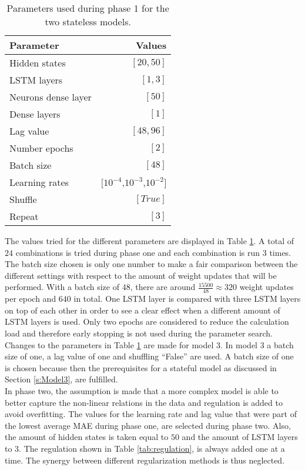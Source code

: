 \begin{table}[ht]
	\centering
	\begin{tabular}{@{}l|r@{}} \toprule
		\textbf{Parameter}	& \textbf{Values}\\\midrule
		Hidden states &  $ [20,50] $\\
		LSTM layers & $ [1,3] $\\
		Neurons dense layer & $ [50] $\\
		Dense layers & $ [1] $\\
		Lag value & $ [48,96] $\\
		Number epochs & $ [2] $\\
		Batch size & $ [48] $\\
		Learning rates & $[ 10^{-4} $,$ 10^{-3} $,$ 10^{-2} ]$\\
		Shuffle & $ [True] $\\
		Repeat & $ [3] $\\\bottomrule
	\end{tabular}
	\caption{Parameters used during phase 1 for the two stateless models.}
	\label{tab:para_phase1}
\end{table}

The values tried for the different parameters are displayed in Table \ref{tab:para_phase1}. A total of $ 24 $ combinations is tried during phase one and each combination is run $ 3 $ times. The batch size chosen is only one number to make a fair comparison between the different settings with respect to the amount of weight updates that will be performed. With a batch size of $ 48 $, there are around $ \frac{15500}{48}\approx 320 $ weight updates per epoch and $ 640 $ in total. One LSTM layer is compared with three LSTM layers on top of each other in order to see a clear effect when a different amount of LSTM layers is used. Only two epochs are considered to reduce the calculation load and therefore early stopping is not used during the parameter search.\\

Changes to the parameters in Table \ref{tab:para_phase1} are made for model $ 3 $. In model $ 3 $ a batch size of one, a lag value of one and shuffling ``False'' are used. A batch size of one is chosen because then the prerequisites for a stateful model as discussed in Section \ref{s:Model3}, are fulfilled.\\

In phase two, the assumption is made that a more complex model is able to better capture the non-linear relations in the data and regulation is added to avoid overfitting. The values for the learning rate and lag value that were part of the lowest average MAE during phase one, are selected during phase two. Also, the amount of hidden states is taken equal to $ 50 $ and the amount of LSTM layers to $ 3 $. The regulation shown in Table \ref{tab:regulation}, is always added one at a time. The synergy between different regularization methods is thus neglected. 

